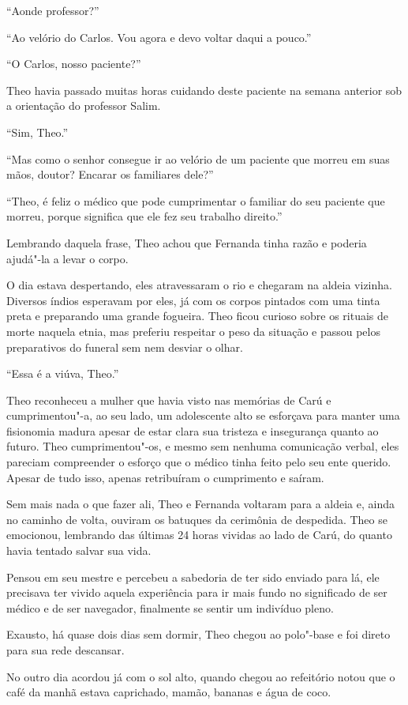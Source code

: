 ``Aonde professor?''

``Ao velório do Carlos. Vou agora e devo voltar daqui a pouco.''

``O Carlos, nosso paciente?''

Theo havia passado muitas horas cuidando deste paciente na semana
anterior sob a orientação do professor Salim.

``Sim, Theo.''

``Mas como o senhor consegue ir ao velório de um paciente que morreu em
suas mãos, doutor? Encarar os familiares dele?''

``Theo, é feliz o médico que pode cumprimentar o familiar do seu
paciente que morreu, porque significa que ele fez seu trabalho
direito.''

Lembrando daquela frase, Theo achou que Fernanda tinha razão e poderia
ajudá"-la a levar o corpo.

O dia estava despertando, eles atravessaram o rio e chegaram na aldeia
vizinha. Diversos índios esperavam por eles, já com os corpos pintados
com uma tinta preta e preparando uma grande fogueira. Theo ficou curioso
sobre os rituais de morte naquela etnia, mas preferiu respeitar o peso
da situação e passou pelos preparativos do funeral sem nem desviar o
olhar.

``Essa é a viúva, Theo.''

Theo reconheceu a mulher que havia visto nas memórias de Carú e
cumprimentou"-a, ao seu lado, um adolescente alto se esforçava para
manter uma fisionomia madura apesar de estar clara sua tristeza e
insegurança quanto ao futuro. Theo cumprimentou"-os, e mesmo sem nenhuma
comunicação verbal, eles pareciam compreender o esforço que o médico
tinha feito pelo seu ente querido. Apesar de tudo isso, apenas
retribuíram o cumprimento e saíram.

Sem mais nada o que fazer ali, Theo e Fernanda voltaram para a aldeia e,
ainda no caminho de volta, ouviram os batuques da cerimônia de
despedida. Theo se emocionou, lembrando das últimas 24 horas vividas ao
lado de Carú, do quanto havia tentado salvar sua vida.

Pensou em seu mestre e percebeu a sabedoria de ter sido enviado para lá,
ele precisava ter vivido aquela experiência para ir mais fundo no
significado de ser médico e de ser navegador, finalmente se sentir um
indivíduo pleno.

Exausto, há quase dois dias sem dormir, Theo chegou ao polo"-base e foi
direto para sua rede descansar.

No outro dia acordou já com o sol alto, quando chegou ao refeitório
notou que o café da manhã estava caprichado, mamão, bananas e água de
coco.


